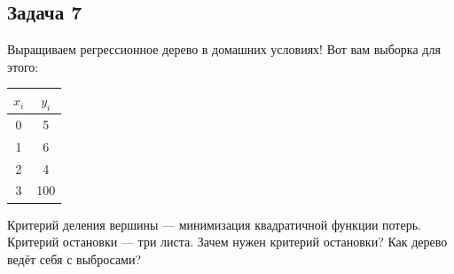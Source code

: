 \documentclass[12pt, a4paper, oneside]{article}
\begin{document}
\subsection*{Задача 7}

Выращиваем регрессионное дерево в домашних условиях! Вот вам выборка для этого: 

\begin{center}
	\begin{tabular}{c|c}
		\hline
		$x_i$ & $y_i$ \\
		\hline
		0 & 5 \\
		1 &  6\\
		2 & 4 \\
		3 & 100 \\
	\end{tabular}
\end{center}

Критерий деления вершины --- минимизация квадратичной функции потерь. Критерий остановки --- три листа.  Зачем нужен критерий остановки? Как дерево ведёт себя с выбросами? 
\end{document}
